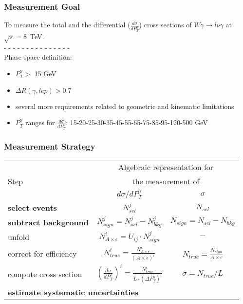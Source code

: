 \begin{frame}\frametitle{Measurement Goal}
  \scriptsize

  To measure the total and the differential ($\frac{d\sigma}{dP_T^{\gamma}}$) cross sections of $W\gamma\rightarrow l\nu\gamma$ at $\sqrt{s}=$8~TeV.\\
  - - - - - - - - - - - - - - - \\
  Phase space definition:
  \begin{itemize}
    \item $P_T^{\gamma}>$ 15 GeV
    \item $\Delta{R}(\gamma,lep) > 0.7$
    \item several more requirements related to geometric and kinematic limitations
    \item $P_T^{\gamma}$ ranges for $\frac{d\sigma}{dP_T^{\gamma}}$: 15-20-25-30-35-45-55-65-75-85-95-120-500 GeV
  \end{itemize}
\end{frame}%

\begin{frame}\frametitle{Measurement Strategy}
\begin{table}[h]
  \scriptsize
  \begin{center}
  \begin{tabular}{|l|c|c|}
    \hline
          & \multicolumn{2}{|c|}{Algebraic representation for} \\ 
     Step & \multicolumn{2}{|c|}{the measurement of} \\ 
          & $d\sigma/dP_{T}^{\gamma}$ & $\sigma$ \\ \hline
    {\bfseries\footnotesize{select events}} & {\bfseries{$N_{sel}^j$}} &    {\bfseries{$N_{sel}$}}       \\ \hline
    {\bfseries\footnotesize{subtract background}} & {\bfseries{$N_{sign}^j = N_{sel}^j - N_{bkg}^j$}} &    {\bfseries{$N_{sign}=N_{sel}-N_{bkg}$}}       \\ \hline
    unfold   & $N_{A\times\epsilon}^i = U_{ij} \cdot N_{sign}^j$ &    $-$       \\ \hline
    correct for efficiency & $N_{true}^i = \frac{N_{A\times\epsilon}^i}{(A \times\epsilon)^i}$ &  $N_{true}=\frac{N_{sign}}{A\times\epsilon}$       \\ \hline
    compute cross section & $ \left( \frac{d\sigma}{dP_{T}^\gamma} \right) ^i = \frac{N_{true}^i}{L \cdot (\Delta P_T^\gamma)^i}$  &  $\sigma = N_{true}/L$       \\ \hline
    \multicolumn{3}{|l|}{\bfseries\footnotesize{estimate systematic uncertainties}}          \\ \hline
  \end{tabular}
  \label{tab:analysisOutline}
  \end{center}
\end{table}
\end{frame}%
